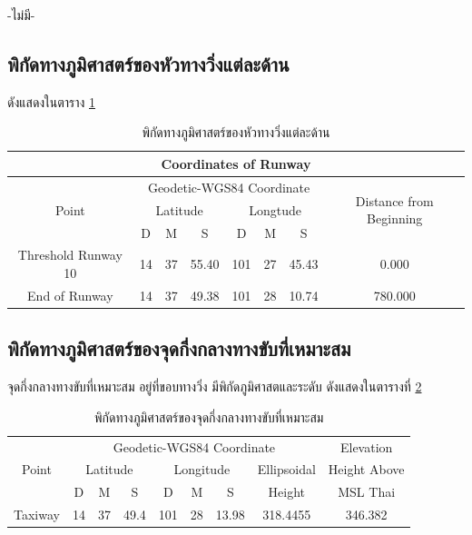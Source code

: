 -ไม่มี-

\subsection{พิกัดทางภูมิศาสตร์ของหัวทางวิ่งแต่ละด้าน}

ดังแสดงในตาราง \ref{พิกัดทางภูมิศาสตร์ของหัวทางวิ่งแต่ละด้าน}

\begin{table}[h]
\caption{พิกัดทางภูมิศาสตร์ของหัวทางวิ่งแต่ละด้าน}
\begin{center}
\begin{tabular}{|c|c|c|c|c|c|c|c|}
\hline
\multicolumn{8}{|c|}{Coordinates of Runway} \\
\hline
\multirow{3}{*}{Point} & \multicolumn{6}{c|}{Geodetic-WGS84 Coordinate} & \multirow{3}{*}{Distance from Beginning} \\ \cline{2-7}
 & \multicolumn{3}{c|}{Latitude} & \multicolumn{3}{c|}{Longtude} & \\ \cline{2-7}
 & D & M & S & D & M & S & \\
 \hline
 Threshold Runway 10 & 14 & 37 & 55.40 & 101 & 27 & 45.43 & 0.000 \\
 End of Runway & 14 & 37 & 49.38 & 101 & 28 & 10.74 & 780.000 \\
 \hline
\end{tabular}
\end{center}
\label{พิกัดทางภูมิศาสตร์ของหัวทางวิ่งแต่ละด้าน}
\end{table}%

\subsection{พิกัดทางภูมิศาสตร์ของจุดกึ่งกลางทางขับที่เหมาะสม}

จุดกึ่งกลางทางขับที่เหมาะสม อยู่ที่ขอบทางวิ่ง มีพิกัดภูมิศาสตและระดับ 
ดังแสดงในตารางที่ \ref{พิกัดทางภูมิศาสตร์ของจุดกึ่งกลางทางขับที่เหมาะสม}

\begin{table}[h!]
\caption{พิกัดทางภูมิศาสตร์ของจุดกึ่งกลางทางขับที่เหมาะสม}
\begin{center}
\begin{tabular}{|c|c|c|c|c|c|c|c|c|}
\hline
\multirow{3}{*}{Point} & \multicolumn{7}{c|}{Geodetic-WGS84 Coordinate} & Elevation \\ \cline{2-9}
 & \multicolumn{3}{c|}{Latitude} & \multicolumn{3}{c|}{Longitude} & Ellipsoidal & Height Above \\ \cline{2-9}
  & D & M & S & D & M & S & Height & MSL Thai \\
\hline
Taxiway & 14 & 37 & 49.4 & 101 & 28 & 13.98 & 318.4455 & 346.382 \\
\hline 
\end{tabular}
\end{center}
\label{พิกัดทางภูมิศาสตร์ของจุดกึ่งกลางทางขับที่เหมาะสม}
\end{table}%

